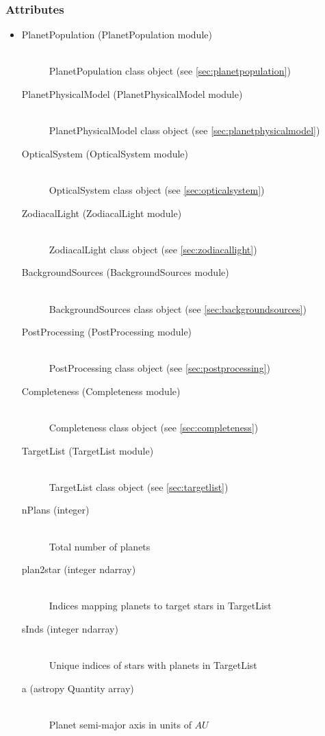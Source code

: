 \documentclass[cleanfoot]{asme2ej}
\begin{document}
\subsubsection{Attributes}
\begin{itemize}
\item
\begin{description}
    \item[PlanetPopulation (PlanetPopulation module)] \hfill \\ PlanetPopulation class object (see \ref{sec:planetpopulation})
    \item[PlanetPhysicalModel (PlanetPhysicalModel module)] \hfill \\ PlanetPhysicalModel class object (see \ref{sec:planetphysicalmodel})
    \item[OpticalSystem (OpticalSystem module)] \hfill \\ OpticalSystem class object (see \ref{sec:opticalsystem})
    \item[ZodiacalLight (ZodiacalLight module)] \hfill \\ ZodiacalLight class object (see \ref{sec:zodiacallight})
    \item[BackgroundSources (BackgroundSources module)] \hfill \\ BackgroundSources class object (see \ref{sec:backgroundsources})
    \item[PostProcessing (PostProcessing module)] \hfill \\ PostProcessing class object (see \ref{sec:postprocessing})
    \item[Completeness (Completeness module)] \hfill \\ Completeness class object (see \ref{sec:completeness})
    \item[TargetList (TargetList module)] \hfill \\ TargetList class object (see \ref{sec:targetlist})
    \item[nPlans (integer)] \hfill \\ Total number of planets
    \item[plan2star (integer ndarray)] \hfill \\ Indices mapping planets to target stars in TargetList
    \item[sInds (integer ndarray)] \hfill \\ Unique indices of stars with planets in TargetList
    \item[a (astropy Quantity array)] \hfill \\ Planet semi-major axis in units of $ AU $

\end{description}
\end{itemize}
\end{document}
